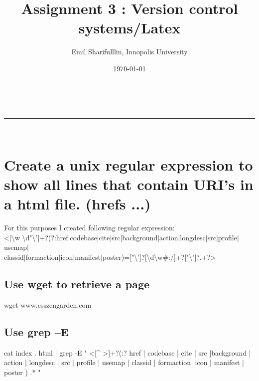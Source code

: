 \documentclass[a4paper,11pt]{article}
\makeatletter
\newcommand*{\TitleFont}{%
      \usefont{\encodingdefault}{\rmdefault}{b}{n}%
      \fontsize{16}{20}%
      \selectfont}
\renewcommand{\maketitle}{
\begin{center}
\vspace{2ex}
{\huge \textsc{\@title}}
\vspace{1ex}
\\
\rule{\linewidth}{0.5pt}\\
\@author \hfill \@date
\vspace{4ex}
\end{center}
}
\makeatother
\begin{document}







\title{ \TitleFont Assignment 3 : Version control systems/Latex }

\author{Emil Sharifulllin, Innopolis University}

\date{\today}

\maketitle

\section{Create a unix regular expression to show all lines that contain
URI’s in a html file. (hrefs ...)}

For this purposes I created following regular expression: \\


\textless{}[\textbackslash{}w \textbackslash{}d"\textbackslash{}']+?(?:href$|$codebase$|$cite$|$src$|$background$|$action$|$longdesc$|$src$|$profile$|$usemap$|$\\classid$|$formaction$|$icon$|$manifest$|$poster)=["\textbackslash{}']?[\textbackslash{}d\textbackslash{}w\#:/]+?["\textbackslash{}']?.+?\textgreater{}




\subsection{Use wget to retrieve a page}

\begin{bashcode}
wget www.csszengarden.com
\end{bashcode}

\subsection{Use grep –E}
\begin{bashcode}
cat index . html | grep -E " <[^ >]+?(:? href | codebase | cite | src |background | action | longdesc | src | profile | usemap | classid | formaction |icon | manifest | poster ) .* "
\end{bashcode}
\end{document}
